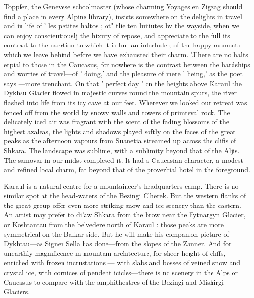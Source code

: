 \documentclass{article}
\begin{document}
	Toppfer, the Genevese schoolmaster (whose charming Voyages en Zigzag should find a place in every Alpine library), insists somewhere on the delights in travel and in life of ' les petites haltos ; ot" tlie ten luiiiutes bv the wayside, when we can enjoy conscieutiouslj the hixury of repose, and appreciate to the full its contrast to the exertion to which it is but an interlude ; of the happy moments which we leave behind before we have exhausted their charm. 'J'here are no halts etpial to those in the Caucasus, for nowhere is the contrast between the hardships and worries of travel—of ' doing,' and the pleasure of mere ' being,' as the poet says —more trenchant. On that ' perfect day ' on the heights above Karaul the Dykhsu Glacier flowed in majestic curves round the mountain spurs, the river flashed into life from its icy cave at our feet. Wherever we looked our retreat was fenced off from the world by snowy walls and towers of primteval rock. The delicately iced air was fragrant with the scent of the fading blossoms of the highest azaleas, the lights and shadows played softly on the faces of the great peaks as the afternoon vapours from Suanetia streamed up across the clifis of Shkara. The landscape was sublime, with a sublimity beyond that of the Aljis. The samovar in our midst completed it. It had a Caucasian character, a modest and refined local charm, far beyond that of the proverbial hotel in the foreground.
	
	Karaul is a natural centre for a mountaineer's headquarters camp. There is no similar spot at the head-waters of the Bezingi C'herek. But the western flanks of the great group offer even more striking snow-and-ice scenery than the eastern. An artist may prefer to di'aw Shkara from the brow near the Fytnargyn Glacier, or Koshtantau from the belvedere north of Karaul : those peaks are more symmetrical on the Balkar side. But he will make his companion picture of Dykhtau—as Signer Sella has done—from the slopes of the Zanner. And for unearthly magnificence in mountain architecture, for sheer height of cliffs, enriched with frozen incrustations — with slabs and bosses of veined snow and crystal ice, with cornices of pendent icicles—there is no scenery in the Alps or Caucasus to compare with the amphitheatres of the Bezingi and Mishirgi Glaciers.
	
\end{document}
